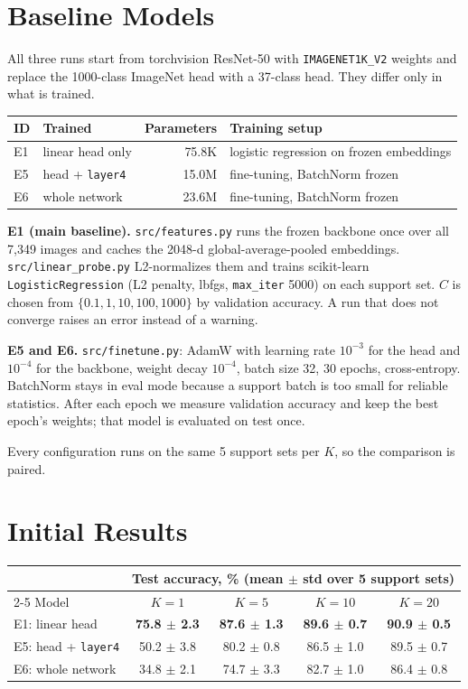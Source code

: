 \documentclass[11pt]{article}
\begin{document}
\section{Baseline Models}

All three runs start from torchvision ResNet-50 with \texttt{IMAGENET1K\_V2} weights and replace
the 1000-class ImageNet head with a 37-class head. They differ only in what is trained.

\begin{tabular}{@{}llrl@{}}
\toprule
ID & Trained & Parameters & Training setup \\
\midrule
E1 & linear head only & 75.8K & logistic regression on frozen embeddings \\
E5 & head + \texttt{layer4} & 15.0M & fine-tuning, BatchNorm frozen \\
E6 & whole network & 23.6M & fine-tuning, BatchNorm frozen \\
\bottomrule
\end{tabular}

\textbf{E1 (main baseline).} \texttt{src/features.py} runs the frozen backbone once over all
7,349 images and caches the 2048-d global-average-pooled embeddings. \texttt{src/linear\_probe.py}
L2-normalizes them and trains scikit-learn \texttt{LogisticRegression} (L2 penalty, lbfgs,
\texttt{max\_iter} 5000) on each support set. $C$ is chosen from $\{0.1, 1, 10, 100, 1000\}$ by
validation accuracy. A run that does not converge raises an error instead of a warning.

\textbf{E5 and E6.} \texttt{src/finetune.py}: AdamW with learning rate $10^{-3}$ for the head and
$10^{-4}$ for the backbone, weight decay $10^{-4}$, batch size 32, 30 epochs, cross-entropy.
BatchNorm stays in eval mode because a support batch is too small for reliable statistics.
After each epoch we measure validation accuracy and keep the best epoch's weights; that model
is evaluated on test once.

Every configuration runs on the same 5 support sets per $K$, so the comparison is paired.

\section{Initial Results}

\begin{tabular}{@{}lcccc@{}}
\toprule
& \multicolumn{4}{c}{Test accuracy, \% (mean $\pm$ std over 5 support sets)} \\
\cmidrule(l){2-5}
Model & $K=1$ & $K=5$ & $K=10$ & $K=20$ \\
\midrule
E1: linear head & \textbf{75.8 $\pm$ 2.3} & \textbf{87.6 $\pm$ 1.3} & \textbf{89.6 $\pm$ 0.7} & \textbf{90.9 $\pm$ 0.5} \\
E5: head + \texttt{layer4} & 50.2 $\pm$ 3.8 & 80.2 $\pm$ 0.8 & 86.5 $\pm$ 1.0 & 89.5 $\pm$ 0.7 \\
E6: whole network & 34.8 $\pm$ 2.1 & 74.7 $\pm$ 3.3 & 82.7 $\pm$ 1.0 & 86.4 $\pm$ 0.8 \\
\bottomrule
\end{tabular}
\end{document}
